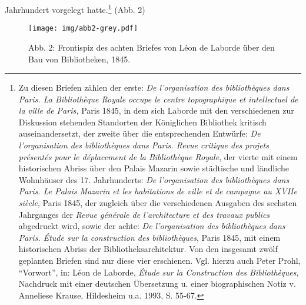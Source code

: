 Jahrhundert vorgelegt hatte.\footnote{Zu diesen Briefen zählen der
  erste: \emph{De l'organisation des bibliothèques dans Paris. La
  Bibliothèque Royale occupe le centre topographique et intellectuel de
  la ville de Paris,} Paris 1845, in dem sich Laborde mit den
  verschiedenen zur Diskussion stehenden Standorten der Königlichen
  Bibliothek kritisch auseinandersetzt, der zweite über die
  entsprechenden Entwürfe: \emph{De l'organisation des bibliothèques
  dans Paris. Revue critique des projets présentés pour le déplacement
  de la Bibliothèque Royale}, der vierte mit einem historischen Abriss
  über den Palais Mazarin sowie städtische und ländliche Wohnhäuser des
  17. Jahrhunderts: \emph{De l'organisation des bibliothèques dans
  Paris. Le Palais Mazarin et les habitations de ville et de campagne au
  XVIIe siècle}, Paris 1845, der zugleich über die verschiedenen
  Ausgaben des sechsten Jahrganges der \emph{Revue générale de
  l'architecture et des travaux publics} abgedruckt wird, sowie der
  achte: \emph{De l'organisation des bibliothèques dans Paris. Étude sur
  la construction des bibliothèques}, Paris 1845, mit einem historischen
  Abriss der Bibliotheksarchitektur. Von den insgesamt zwölf geplanten
  Briefen sind nur diese vier erschienen. Vgl. hierzu auch Peter Prohl,
  \enquote{Vorwort}, in: Léon de Laborde, \emph{Étude sur la
  Construction des Bibliothèques}, Nachdruck mit einer deutschen
  Übersetzung u. einer biographischen Notiz v. Anneliese Krause,
  Hildesheim u.a. 1993, S. 55-67.} (Abb. 2)

\begin{figure}[htbp]
\centering
\texttt{[image: img/abb2-grey.pdf]}
\caption*{Abb. 2: Frontispiz des achten Briefes von Léon de Laborde über
den Bau von Bibliotheken, 1845.}
\end{figure}

